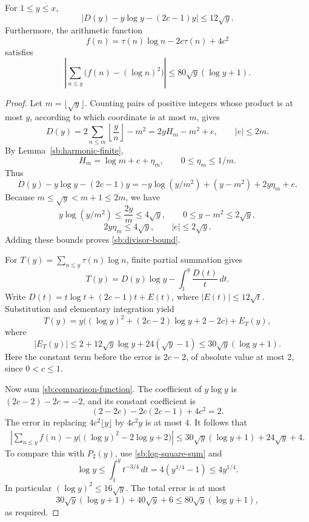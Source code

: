 \begin{lemma}
\label{sb:divisor-approx}
For $1\le y\le x$,
\begin{equation}
 |D(y)-y\log y-(2c-1)y|\le12\sqrt y.
 \label{sb:divisor-bound}
\end{equation}
Furthermore, the arithmetic function
\begin{equation}
 f(n)=\tau(n)\log n-2c\tau(n)+4c^2
 \label{sb:comparison-function}
\end{equation}
satisfies
\begin{equation}
 \left|\sum_{n\le y}\bigl(f(n)-(\log n)^2\bigr)\right|
       \le80\sqrt y(\log y+1).
 \label{sb:comparison-error}
\end{equation}
\end{lemma}

\begin{proof}
Let $m=\lfloor\sqrt y\rfloor$.  Counting pairs of positive integers
whose product is at most $y$, according to which coordinate is at most
$m$, gives
\[
 D(y)=2\sum_{n\le m}\left\lfloor\frac yn\right\rfloor-m^2
     =2yH_m-m^2+e,\qquad |e|\le2m.
\]
By Lemma~\ref{sb:harmonic-finite},
\[
 H_m=\log m+c+\eta_m,\qquad 0\le\eta_m\le1/m.
\]
Thus
\[
 D(y)-y\log y-(2c-1)y
   =-y\log(y/m^2)+(y-m^2)+2y\eta_m+e.
\]
Because $m\le\sqrt y<m+1\le2m$, we have
\[
 y\log(y/m^2)\le\frac{2y}{m}\le4\sqrt y,
 \qquad 0\le y-m^2\le2\sqrt y,
\]
\[
 2y\eta_m\le4\sqrt y,\qquad |e|\le2\sqrt y.
\]
Adding these bounds proves \eqref{sb:divisor-bound}.

For $T(y)=\sum_{n\le y}\tau(n)\log n$, finite partial summation gives
\[
 T(y)=D(y)\log y-\int_1^y\frac{D(t)}t\,dt.
\]
Write $D(t)=t\log t+(2c-1)t+E(t)$, where
$|E(t)|\le12\sqrt t$.  Substitution and elementary integration yield
\[
 T(y)=y\bigl((\log y)^2+(2c-2)\log y+2-2c\bigr)+E_T(y),
\]
where
\[
 |E_T(y)|\le2+12\sqrt y\log y+24(\sqrt y-1)
                 \le30\sqrt y(\log y+1).
\]
Here the constant term before the error is $2c-2$, of absolute value
at most $2$, since $0<c\le1$.

Now sum \eqref{sb:comparison-function}.  The coefficient of
$y\log y$ is $(2c-2)-2c=-2$, and its constant coefficient is
\[
 (2-2c)-2c(2c-1)+4c^2=2.
\]
The error in replacing $4c^2\lfloor y\rfloor$ by $4c^2y$ is at most
$4$.  It follows that
\begin{align*}
 \left|\sum_{n\le y}f(n)
           -y\bigl((\log y)^2-2\log y+2\bigr)\right|
 \le30\sqrt y(\log y+1)+24\sqrt y+4.
\end{align*}
To compare this with $P_2(y)$, use \eqref{sb:log-square-sum} and
\[
 \log y\le\int_1^y t^{-3/4}\,dt
            =4(y^{1/4}-1)\le4y^{1/4}.
\]
In particular $(\log y)^2\le16\sqrt y$.  The total error is at most
\[
 30\sqrt y(\log y+1)+40\sqrt y+6
       \le80\sqrt y(\log y+1),
\]
as required.
\end{proof}

